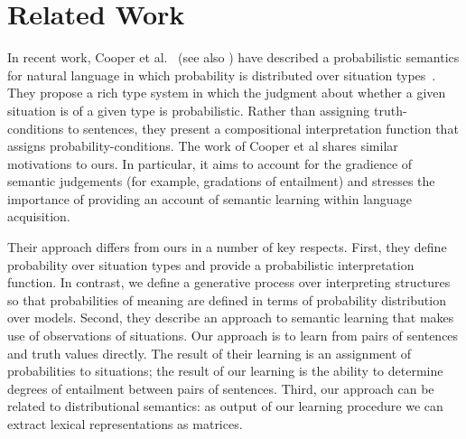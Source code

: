 \documentclass[11pt]{article}
\theoremstyle{definition}
\begin{document}


\section{Related Work}


In recent work, Cooper et al.~\cite{Cooper:14} (see also
\cite{Eijck:12}) have described a probabilistic semantics for natural language in which probability is distributed over situation types~\cite{Barwise:83}. They propose a rich type system in which the judgment about whether a given situation is of a given type is probabilistic. Rather than assigning truth-conditions to sentences, they present a compositional interpretation function that assigns probability-conditions. The work of Cooper et al shares similar motivations to ours. In particular, it aims to account for the gradience of semantic judgements (for example, gradations of entailment) and stresses the importance of providing an account of semantic learning within language acquisition.

Their approach differs from ours in a number of key respects. First, they define probability over situation types and provide a probabilistic interpretation function. In contrast, we define a generative process over interpreting structures so that probabilities of meaning are defined in terms of probability distribution over models. Second, they describe an approach to semantic learning that makes use of observations of situations. Our approach is to learn from pairs of sentences and truth values directly. The result of their learning is an assignment of probabilities to situations; the result of our learning is the ability to determine degrees of entailment between pairs of sentences. Third, our approach can be related to distributional semantics: as output of our learning procedure we can extract lexical representations as matrices.
\end{document}
